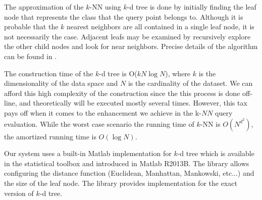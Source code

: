 \iftoggle{edit-mode}{\hspace{0pt}\marginpar{How the NN are found?}}{}
The approximation of the $k$-NN using $k$-d tree is done by initially finding the leaf node that represents the class that the query point belongs to. Although it is probable that the $k$ nearest neighbors are all contained in a single leaf node, it is not necessarily the case. Adjacent leafs may be examined by recursively explore the other child nodes and look for near neighbors. Precise details of the algorithm can be found in \cite{bentley1975multidimensional}.
 
\iftoggle{edit-mode}{\hspace{0pt}\marginpar{Expected time complexity}}{}
The construction time of the $k$-d tree is O($k N \log N$), where $k$ is the dimensionality of the data space and $N$ is the cardinality of the dataset. We can afford this high complexity of the construction since the this process is done off-line, and theoretically will be executed mostly several times. However, this tax pays off when it comes to the enhancement we achieve in the k-$NN$ query evaluation. While the worst case scenario the running time of $k$-NN is $O(N^{d^2})$, the amortized running time is $O(\log N)$.

\iftoggle{edit-mode}{\hspace{0pt}\marginpar{The Matlab library}}{} 
Our system uses a built-in Matlab implementation for $k$-d tree which is available in the statistical toolbox and introduced in Matlab R2013B. The library allows configuring the distance function (Euclidean, Manhattan, Mankowski, etc...) and the size of the leaf node. The library provides implementation for the exact version of $k$-d tree.

\newpage{}

